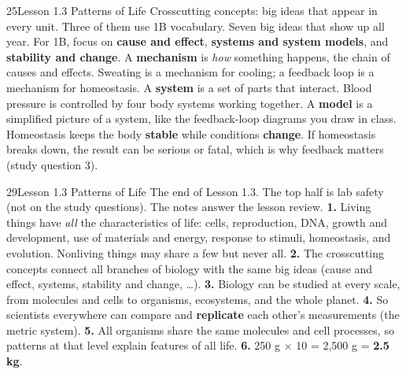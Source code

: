 \documentclass[11pt,letterpaper]{article}
\begin{document}
\begin{tbpage}{25}{Lesson 1.3 Patterns of Life}
  {Crosscutting concepts: big ideas that appear in every unit. Three of them use 1B vocabulary.}
    {Seven big ideas that show up all year. For 1B, focus on \textbf{cause and effect}, \textbf{systems and system models}, and \textbf{stability and change}.}
    {A \textbf{mechanism} is \emph{how} something happens, the chain of causes and effects. Sweating is a mechanism for cooling; a feedback loop is a mechanism for homeostasis.}
    {A \textbf{system} is a set of parts that interact. Blood pressure is controlled by four body systems working together. A \textbf{model} is a simplified picture of a system, like the feedback-loop diagrams you draw in class.}
    {Homeostasis keeps the body \textbf{stable} while conditions \textbf{change}. If homeostasis breaks down, the result can be serious or fatal, which is why feedback matters (study question 3).}
\end{tbpage}

\begin{tbpage}{29}{Lesson 1.3 Patterns of Life}
  {The end of Lesson 1.3. The top half is lab safety (not on the study questions). The notes answer the lesson review.}
    {\textbf{1.} Living things have \emph{all} the characteristics of life: cells, reproduction, DNA, growth and development, use of materials and energy, response to stimuli, homeostasis, and evolution. Nonliving things may share a few but never all. \textbf{2.} The crosscutting concepts connect all branches of biology with the same big ideas (cause and effect, systems, stability and change, \dots{}). \textbf{3.} Biology can be studied at every scale, from molecules and cells to organisms, ecosystems, and the whole planet.}
    {\textbf{4.} So scientists everywhere can compare and \textbf{replicate} each other's measurements (the metric system). \textbf{5.} All organisms share the same molecules and cell processes, so patterns at that level explain features of all life. \textbf{6.} 250 g $\times$ 10 = 2,500 g = \textbf{2.5 kg}.}
\end{tbpage}
\end{document}
